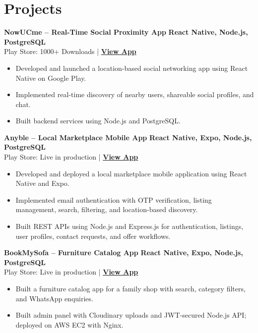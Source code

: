 \documentclass[a4paper,11pt]{article}
\begin{document}
\section*{Projects}

\noindent\textbf{NowUCme -- Real-Time Social Proximity App} \hfill \textbf{React Native, Node.js, PostgreSQL}\\
Play Store: 1000+ Downloads \;|\; \href{https://play.google.com/store/apps/details?id=com.nowucme.app}{\textbf{View App}}
\begin{itemize}
    \item Developed and launched a location-based social networking app using React Native on Google Play.
    \item Implemented real-time discovery of nearby users, shareable social profiles, and chat.
    \item Built backend services using Node.js and PostgreSQL.
\end{itemize}

\vspace{3pt}
\noindent\textbf{Anyble -- Local Marketplace Mobile App} \hfill \textbf{React Native, Expo, Node.js, PostgreSQL}\\
Play Store: Live in production \;|\; \href{https://play.google.com/store/apps/details?id=com.anyble.app}{\textbf{View App}}
\begin{itemize}
    \item Developed and deployed a local marketplace mobile application using React Native and Expo.
    \item Implemented email authentication with OTP verification, listing management, search, filtering, and location-based discovery.
    \item Built REST APIs using Node.js and Express.js for authentication, listings, user profiles, contact requests, and offer workflows.
\end{itemize}

\vspace{3pt}
\noindent\textbf{BookMySofa -- Furniture Catalog App} \hfill \textbf{React Native, Expo, Node.js, PostgreSQL}\\
Play Store: Live in production \;|\; \href{https://play.google.com/store/apps/details?id=com.bookmysofa.app}{\textbf{View App}}
\begin{itemize}
    \item Built a furniture catalog app for a family shop with search, category filters, and WhatsApp enquiries.
    \item Built admin panel with Cloudinary uploads and JWT-secured Node.js API; deployed on AWS EC2 with Nginx.
\end{itemize}
\end{document}

